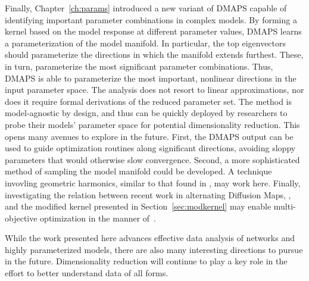 Finally, Chapter~\ref{ch:params} introduced a new variant of DMAPS
capable of identifying important parameter combinations in complex
models. By forming a kernel based on the model response at different
parameter values, DMAPS learns a parameterization of the model
manifold. In particular, the top eigenvectors should parameterize the
directions in which the manifold extends furthest. These, in turn,
parameterize the most significant parameter combinations. Thus, DMAPS
is able to parameterize the most important, nonlinear directions in
the input parameter space. The analysis does not resort to linear
approximations, nor does it require formal derivations of the reduced
parameter set. The method is model-agnostic by design, and thus can be
quickly deployed by researchers to probe their models' parameter space
for potential dimensionality reduction. This opens many avenues to
explore in the future. First, the DMAPS output can be used to guide
optimization routines along significant directions, avoiding sloppy
parameters that would otherwise slow convergence. Second, a more
sophisticated method of sampling the model manifold could be
developed. A technique invovling geometric harmonics, similar to that
found in \cite{Anastasia}, may work here. Finally, investigating the
relation between recent work in alternating Diffusion Maps,
\cite{alternating dmaps}, and the modified kernel presented in
Section~\ref{sec:modkernel} may enable multi-objective optimization in
the manner of~\cite{nn multi-objective}.

While the work presented here advances effective data analysis of
networks and highly parameterized models, there are also many
interesting directions to pursue in the future. Dimensionality
reduction will continue to play a key role in the effort to better
understand data of all forms.



